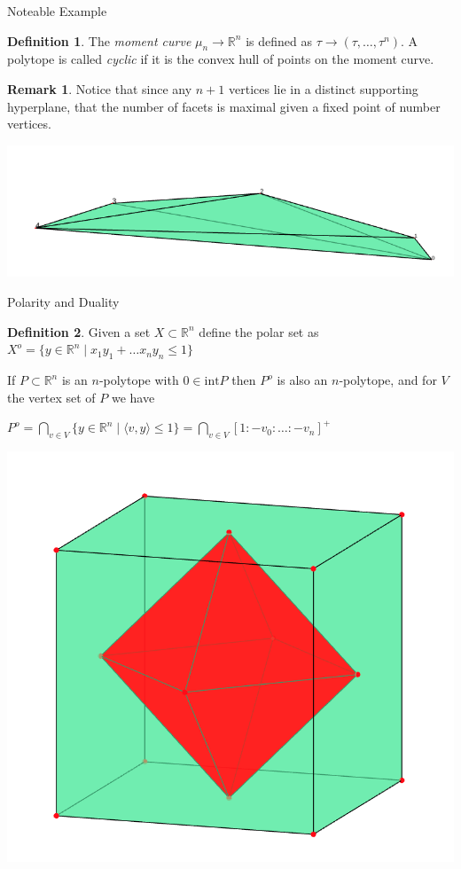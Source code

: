 \documentclass[9pt]{beamer}
\newcommand\R{\mathbb{R}}
\newcommand\set[1]{\{#1\}}
\theoremstyle{definition}
\newtheorem*{remark}{Remark}
\newtheorem{defn}{Definition}
\begin{document}
\begin{frame}[fragile]{Noteable Example}
  \begin{defn}
    The \emph{moment curve} $\mu_n \to \mathbb{R}^n$ is defined as
    $\tau \to (\tau, \dots, \tau^n)$. A polytope is called \emph{cyclic}
    if it is the convex hull of points on the moment curve.
  \end{defn}
  \begin{remark}
    Notice that since any $n + 1$ vertices lie in a distinct supporting
    hyperplane, that the number of facets is maximal given a fixed point
    of number vertices.
  \end{remark}

  \begin{center}
    \includegraphics[width=.30\textwidth, height=0.4\textheight]{images/cyclic}
  \end{center}
\end{frame}

\begin{frame}[fragile]{Polarity and Duality}
  \begin{defn}
    Given a set $X \subset \mathbb{R}^n$ define the polar set as
    $X^o = \{y \in \mathbb{R}^n \mid x_1y_1 + \dots x_ny_n \leq 1\}$
  \end{defn}
  \begin{theorem}
    If $P \subset \mathbb{R}^n$ is an $n$-polytope with $0 \in \text{int}P$ then
    $P^o$ is also an $n$-polytope, and for $V$ the vertex set of $P$ we have
    \begin{center}
      $P^o = \bigcap_{v \in V} \set{y \in \R^n \mid \langle v, y \rangle \leq 1} = \bigcap_{v \in V} [1: -v_0: \dots : -v_n]^+$
    \end{center}
  \end{theorem}
  \begin{center}
    \includegraphics[width=.30\textwidth, height=0.4\textheight]{images/polar}
  \end{center}
\end{frame}
\end{document}
